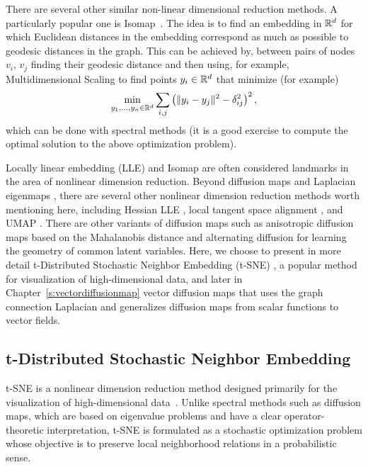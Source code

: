 There are several other similar non-linear dimensional reduction methods. A particularly popular one is Isomap~\cite{ISOMAP_paper_2000}. The idea is to find an embedding in $\mathbb{R}^d$ for which Euclidean distances in the embedding correspond as much as possible to geodesic distances in the graph. This can be achieved by, between pairs of nodes $v_i,\,v_j$ finding their geodesic distance and then using, for example, Multidimensional Scaling to find points $y_i\in\mathbb{R}^d$ that minimize (for example)
\[
\min_{y_1,\dots,y_n \in \mathbb{R}^d}\sum_{i,j} \left(   \|y_i-y_j\|^2 - \delta_{ij}^2   \right)^2,
\]
which can be done with spectral methods (it is a good exercise to compute the optimal solution to the above optimization problem). 

Locally linear embedding (LLE) \cite{roweis2000nonlinear} and Isomap are often considered landmarks in the area of nonlinear dimension reduction.  Beyond diffusion maps \cite{RRCoifman_SLafon_2006} and Laplacian eigenmaps \cite{belkin2001laplacian,belkin2003laplacian}, there are several other nonlinear dimension reduction methods worth mentioning here, including Hessian LLE \cite{donoho2003hessian}, local tangent space alignment \cite{zhang2004principal}, and UMAP \cite{mcinnes2018umap}. There are other variants of diffusion maps such as anisotropic diffusion maps based on the Mahalanobis distance \cite{singer2008non} and alternating diffusion \cite{lederman2018learning} for learning the geometry of common latent variables. Here, we choose to present in more detail t-Distributed Stochastic Neighbor Embedding (t-SNE) \cite{maaten2008visualizing}, a popular method for visualization of high-dimensional data, and later in Chapter~\ref{s:vectordiffusionmap} vector diffusion maps \cite{ASinger_HTWu_2011_VDM}  that uses the graph connection Laplacian and generalizes diffusion maps from scalar functions to vector fields.              






\subsection{t-Distributed Stochastic Neighbor Embedding}\label{s:tsne}



t-SNE is a nonlinear dimension reduction method designed primarily for the visualization of high-dimensional data~\cite{maaten2008visualizing}.
Unlike spectral methods such as diffusion maps, which are based on eigenvalue problems and have a clear operator-theoretic interpretation, t-SNE is formulated as a stochastic optimization problem whose objective is to preserve local neighborhood relations in a probabilistic sense.

